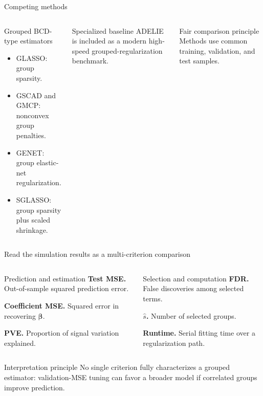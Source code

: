 \documentclass[newPxFont,nosectionpage]{beamer}
\newcommand{\bbeta}{\bm{\beta}}
\begin{document}
\begin{frame}{Competing methods}
\footnotesize
\begin{columns}[T,onlytextwidth]
\begin{block}{Grouped BCD-type estimators}
\begin{itemize}
  \item GLASSO: group sparsity.
  \item GSCAD and GMCP: nonconvex group penalties.
  \item GENET: group elastic-net regularization.
  \item SGLASSO: group sparsity plus scaled shrinkage.
\end{itemize}
\end{block}
\begin{block}{Specialized baseline}
ADELIE is included as a modern high-speed grouped-regularization benchmark.
\end{block}
\begin{block}{Fair comparison principle}
Methods use common training, validation, and test samples.
\end{block}
\end{columns}
\end{frame}

\begin{frame}{Read the simulation results as a multi-criterion comparison}
\footnotesize
\begin{columns}[T,onlytextwidth]
\begin{block}{Prediction and estimation}
\textbf{Test MSE.} Out-of-sample squared prediction error.\par\smallskip
\textbf{Coefficient MSE.} Squared error in recovering $\bbeta$.\par\smallskip
\textbf{PVE.} Proportion of signal variation explained.
\end{block}
\begin{block}{Selection and computation}
\textbf{FDR.} False discoveries among selected terms.\par\smallskip
\textbf{$\widehat{s}$.} Number of selected groups.\par\smallskip
\textbf{Runtime.} Serial fitting time over a regularization path.
\end{block}
\end{columns}
\vspace{0.25em}
\begin{alertblock}{Interpretation principle}
No single criterion fully characterizes a grouped estimator: validation-MSE tuning can favor a broader model if correlated groups improve prediction.
\end{alertblock}
\end{frame}
\end{document}
